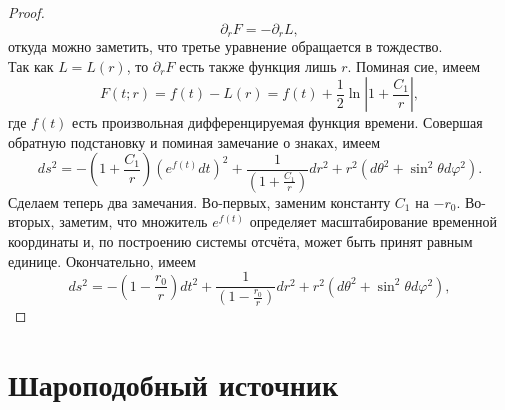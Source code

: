 \documentclass[a4paper, 14pt]{scrarticle}
\theoremstyle{Imperial}
\begin{document}
\begin{proof}
		$$\partial_r F = - \partial_r L,$$
		откуда можно заметить, что третье уравнение обращается в тождество.	\\
		Так как $L = L(r)$, то $\partial_r	F$ есть также функция лишь $r$. Поминая сие, 
		имеем
		$$F(t;r) = f(t) - L(r) = f(t) + \frac{1}{2} \ln | 1 + \frac{C_1}{r} |,$$
		где $f(t)$ есть произвольная дифференцируемая функция времени. Совершая обратную подстановку и поминая замечание о знаках, имеем
		$$ds^2 = - \left(1 + \frac{C_1}{r}\right) \left( e^{f(t)}dt\right) ^2 + \frac{1}{\left(1 + \frac{C_1}{r}\right)} dr^2 + r^2 \left( d\theta^2 + \sin^2 \theta d\varphi^2 \right).$$	
		Сделаем теперь два замечания. Во-первых, заменим константу $C_1$ на $-r_0$. Во-вторых, заметим, что множитель $e^{f(t)}$ определяет масштабирование временной координаты и, по построению системы отсчёта, может быть принят равным единице. Окончательно, имеем
		$$ds^2 = - \left(1 - \frac{r_0}{r}\right)  dt^2 + \frac{1}{\left(	1 - \frac{r_0}{r}\right)} dr^2 + r^2 \left( d\theta^2 + \sin^2 \theta d\varphi^2 \right),$$	
	\end{proof}	

	\section{Шароподобный источник}
\end{document}
